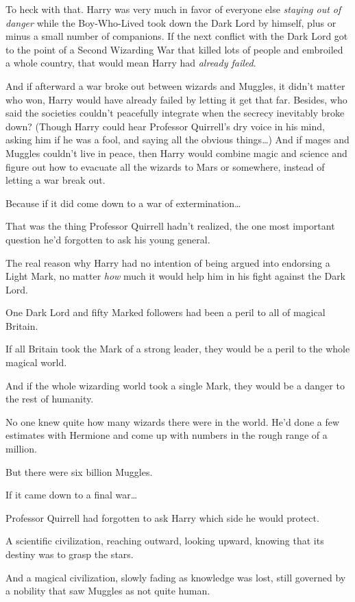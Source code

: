 To heck with that. Harry was very much in favor of everyone else \emph{staying 
out of danger} while the Boy-Who-Lived took down the Dark Lord by himself, plus 
or minus a small number of companions. If the next conflict with the Dark Lord 
got to the point of a Second Wizarding War that killed lots of people and 
embroiled a whole country, that would mean Harry had \emph{already failed}.

And if afterward a war broke out between wizards and Muggles, it didn't matter 
who won, Harry would have already failed by letting it get that far. Besides, 
who said the societies couldn't peacefully integrate when the secrecy 
inevitably broke down? (Though Harry could hear Professor Quirrell's dry voice 
in his mind, asking him if he was a fool, and saying all the obvious 
things{\ldots}) And if mages and Muggles couldn't live in peace, then Harry 
would combine magic and science and figure out how to evacuate all the wizards 
to Mars or somewhere, instead of letting a war break out.

Because if it did come down to a war of extermination{\ldots}

That was the thing Professor Quirrell hadn't realized, the one most important 
question he'd forgotten to ask his young general.

The real reason why Harry had no intention of being argued into endorsing a 
Light Mark, no matter \emph{how} much it would help him in his fight against 
the Dark Lord.

One Dark Lord and fifty Marked followers had been a peril to all of magical 
Britain.

If all Britain took the Mark of a strong leader, they would be a peril to the 
whole magical world.

And if the whole wizarding world took a single Mark, they would be a danger to 
the rest of humanity.

No one knew quite how many wizards there were in the world. He'd done a few 
estimates with Hermione and come up with numbers in the rough range of a 
million.

But there were six billion Muggles.

If it came down to a final war{\ldots}

Professor Quirrell had forgotten to ask Harry which side he would protect.

A scientific civilization, reaching outward, looking upward, knowing that its 
destiny was to grasp the stars.

And a magical civilization, slowly fading as knowledge was lost, still governed 
by a nobility that saw Muggles as not quite human.

